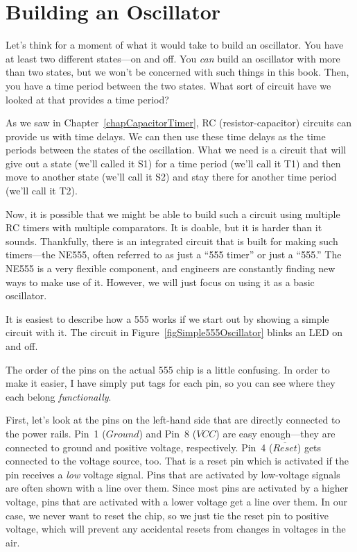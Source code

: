 \section{Building an Oscillator}

Let's think for a moment of what it would take to build an oscillator.
You have at least two different states---on and off.
You \emph{can} build an oscillator with more than two states, but we won't be concerned with such things in this book.
Then, you have a time period between the two states.
What sort of circuit have we looked at that provides a time period?

As we saw in Chapter~\ref{chapCapacitorTimer}, RC (resistor-capacitor) circuits can provide us with time delays.
We can then use these time delays as the time periods between the states of the oscillation.
What we need is a circuit that will give out a state (we'll called it S1) for a time period (we'll call it T1) and then move to another state (we'll call it S2) and stay there for another time period (we'll call it T2).

Now, it is possible that we might be able to build such a circuit using multiple RC timers with multiple comparators.
It is doable, but it is harder than it sounds.
Thankfully, there is an integrated circuit that is built for making such timers---the NE555, often referred to as just a ``555 timer'' or just a ``555.''
The NE555 is a very flexible component, and engineers are constantly finding new ways to make use of it.
However, we will just focus on using it as a basic oscillator.


It is easiest to describe how a 555 works if we start out by showing a simple circuit with it.
The circuit in Figure~\ref{figSimple555Oscillator} blinks an LED on and off.


The order of the pins on the actual 555 chip is a little confusing.
In order to make it easier, I have simply put tags for each pin, so you can see where they each belong \emph{functionally}.

First, let's look at the pins on the left-hand side that are directly connected to the power rails.
Pin~1 ($Ground$) and Pin~8 ($VCC$) are easy enough---they are connected to ground and positive voltage, respectively.
Pin~4 ($\overline{Reset}$) gets connected to the voltage source, too.
That is a reset pin which is activated if the pin receives a \emph{low} voltage signal.
Pins that are activated by low-voltage signals are often shown with a line over them.
Since most pins are activated by a higher voltage, pins that are activated with a lower voltage get a line over them.
In our case, we never want to reset the chip, so we just tie the reset pin to positive voltage, which will prevent any accidental resets from changes in voltages in the air.

